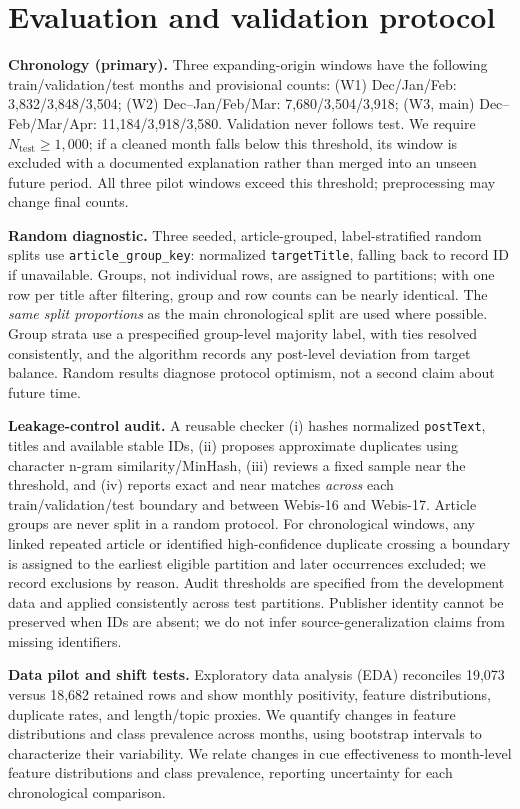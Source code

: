 \documentclass[11pt]{article}
\begin{document}
\section{Evaluation and validation protocol}
\textbf{Chronology (primary).} Three expanding-origin windows have the following train/validation/test months and provisional counts: (W1) Dec/Jan/Feb: 3,832/3,848/3,504; (W2) Dec--Jan/Feb/Mar: 7,680/3,504/3,918; (W3, main) Dec--Feb/Mar/Apr: 11,184/3,918/3,580. Validation never follows test. We require $N_{\mathrm{test}}\geq1{,}000$; if a cleaned month falls below this threshold, its window is excluded with a documented explanation rather than merged into an unseen future period. All three pilot windows exceed this threshold; preprocessing may change final counts.

\textbf{Random diagnostic.} Three seeded, article-grouped, label-stratified random splits use \texttt{article\_group\_key}: normalized \texttt{targetTitle}, falling back to record ID if unavailable. Groups, not individual rows, are assigned to partitions; with one row per title after filtering, group and row counts can be nearly identical. The \emph{same split proportions} as the main chronological split are used where possible. Group strata use a prespecified group-level majority label, with ties resolved consistently, and the algorithm records any post-level deviation from target balance. Random results diagnose protocol optimism, not a second claim about future time.

\textbf{Leakage-control audit.} A reusable checker (i) hashes normalized \texttt{postText}, titles and available stable IDs, (ii) proposes approximate duplicates using character n-gram similarity/MinHash, (iii) reviews a fixed sample near the threshold, and (iv) reports exact and near matches \emph{across} each train/validation/test boundary and between Webis-16 and Webis-17. Article groups are never split in a random protocol. For chronological windows, any linked repeated article or identified high-confidence duplicate crossing a boundary is assigned to the earliest eligible partition and later occurrences excluded; we record exclusions by reason. Audit thresholds are specified from the development data and applied consistently across test partitions. Publisher identity cannot be preserved when IDs are absent; we do not infer source-generalization claims from missing identifiers.

\textbf{Data pilot and shift tests.} Exploratory data analysis (EDA) reconciles 19,073 versus 18,682 retained rows and show monthly positivity, feature distributions, duplicate rates, and length/topic proxies. We quantify changes in feature distributions and class prevalence across months, using bootstrap intervals to characterize their variability. We relate changes in cue effectiveness to month-level feature distributions and class prevalence, reporting uncertainty for each chronological comparison.
\end{document}
